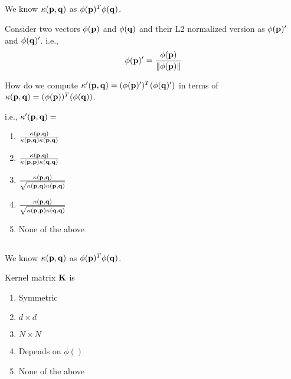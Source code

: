 \begin{frame}
\section{}
We know $\kappa({\bf p}, {\bf q})$ as $\phi({\bf p})^T\phi({\bf q})$.

Consider two vectors $\phi({\bf p})$ and $\phi({\bf q})$ and their L2 normalized version as $\phi({\bf p})^\prime$ and $\phi({\bf q})^\prime$. i.e.,
\[ \phi({\bf p})^\prime =\frac{\phi({\bf p})}{\Vert\phi({\bf p})\Vert} \]

How do we compute $\kappa^\prime ({\bf p}, {\bf q}) =  (\phi({\bf p})^\prime)^T(\phi({\bf q})^\prime)$ in terms of $\kappa ({\bf p}, {\bf q}) =  (\phi({\bf p}))^T(\phi({\bf q}))$.

i.e., $\kappa^\prime ({\bf p}, {\bf q}) = $
\begin{enumerate}[label=(\Alph*)]
\item $\frac{\kappa({\bf p}, {\bf q})}{\kappa({\bf p}, {\bf q})\kappa({\bf p}, {\bf q})}$
\item $\frac{\kappa({\bf p}, {\bf q})}{\kappa({\bf p}, {\bf p})\kappa({\bf q}, {\bf q})}$
\item $\frac{\kappa({\bf p}, {\bf q})}{\sqrt{{\kappa({\bf p}, {\bf q})\kappa({\bf p}, {\bf q})}}}$
\item $\frac{\kappa({\bf p}, {\bf q})}{\sqrt{{\kappa({\bf p}, {\bf p})\kappa({\bf q}, {\bf q})}}}$    %
\item None of the above  %
\end{enumerate}
\end{frame}


\begin{frame}
\section{}
We know $\kappa({\bf p}, {\bf q})$ as $\phi({\bf p})^T\phi({\bf q})$.

Kernel matrix ${\bf K}$ is
\begin{enumerate}[label=(\Alph*)]
\item Symmetric   %
\item $d\times d$
\item $N\times N$   %
\item Depends on $\phi()$   %
\item None of the above    %
\end{enumerate}
\end{frame}

